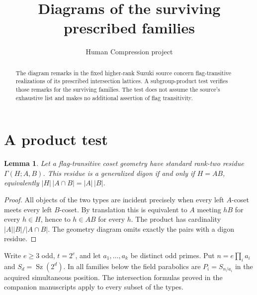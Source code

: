 \documentclass[11pt,a4paper]{article}
\title{Diagrams of the surviving prescribed families}
\author{Human Compression project}\date{}
\newtheorem{lemma}{Lemma}\newtheorem{proposition}[lemma]{Proposition}
\newcommand{\Sz}{\operatorname{Sz}}
\begin{document}
\maketitle
\begin{abstract}
The diagram remarks in the fixed higher-rank Suzuki source concern
flag-transitive realizations of its prescribed intersection lattices.
A subgroup-product test verifies those remarks for the surviving
families. The test does not assume the source's exhaustive list and
makes no additional assertion of flag transitivity.
\end{abstract}

\section{A product test}
\begin{lemma}\label{product}
Let a flag-transitive coset geometry have standard rank-two residue
$\Gamma(H;A,B)$. This residue is a generalized digon if and only if
$H=AB$, equivalently $|H|\,|A\cap B|=|A|\,|B|$.
\end{lemma}
\begin{proof}
All objects of the two types are incident precisely when every left
$A$-coset meets every left $B$-coset. By translation this is equivalent
to $A$ meeting $hB$ for every $h\in H$, hence to $h\in AB$ for
every $h$. The product has cardinality $|A||B|/|A\cap B|$.
The geometry diagram omits exactly the pairs with a digon residue.
\end{proof}

Write $e\ge3$ odd, $t=2^e$, and let $a_1,\ldots,a_k$ be distinct
odd primes. Put $n=e\prod_i a_i$ and $S_d=\Sz(2^d)$.
In all families below the field parabolics are $P_i=S_{n/a_i}$ in
the acquired simultaneous position. The intersection formulas proved
in the companion manuscripts apply to every subset of the types.
\end{document}
